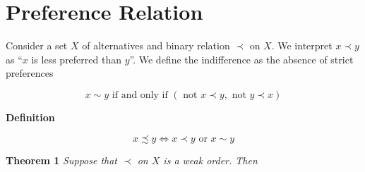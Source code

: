 \documentclass{article}
\theoremstyle{definition}
\def\tor{\text{ or }}
\def\tnot{\text{ not }}
\def\tiff{\text{ if and only if }}
\begin{document}
\section{Preference Relation}

Consider a set $X$ of alternatives and binary relation $\prec$ on $X$. We interpret $x\prec y$ as ``$x$ is less preferred than $y$''. We define the indifference as the absence of strict preferences

\begin{equation*}
x\sim y \tiff (\tnot x\prec y, \tnot y\prec x)
\end{equation*}

{\bf Definition}

\begin{equation*}
x\precsim y\iff x\prec y \tor x\sim y
\end{equation*}

{\bf Theorem 1} {\it Suppose that $\prec$ on $X$ is a weak order. Then}
\end{document}
